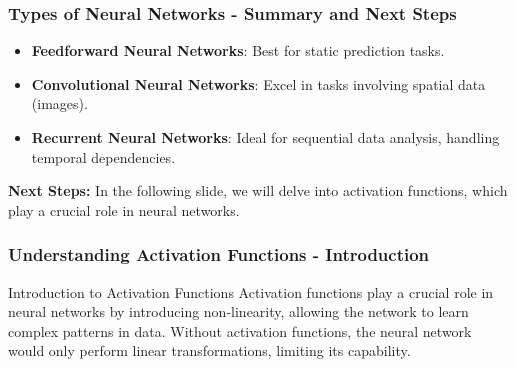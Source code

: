 \documentclass[aspectratio=169]{beamer}
\begin{document}
\begin{frame}[fragile]
    \frametitle{Types of Neural Networks - Summary and Next Steps}
    \begin{itemize}
        \item \textbf{Feedforward Neural Networks}: Best for static prediction tasks.
        \item \textbf{Convolutional Neural Networks}: Excel in tasks involving spatial data (images).
        \item \textbf{Recurrent Neural Networks}: Ideal for sequential data analysis, handling temporal dependencies.
    \end{itemize}

    \textbf{Next Steps:} In the following slide, we will delve into activation functions, which play a crucial role in neural networks.
\end{frame}

\begin{frame}[fragile]
    \frametitle{Understanding Activation Functions - Introduction}
    \begin{block}{Introduction to Activation Functions}
        Activation functions play a crucial role in neural networks by introducing non-linearity, allowing the network to learn complex patterns in data. Without activation functions, the neural network would only perform linear transformations, limiting its capability.
    \end{block}
\end{frame}
\end{document}
